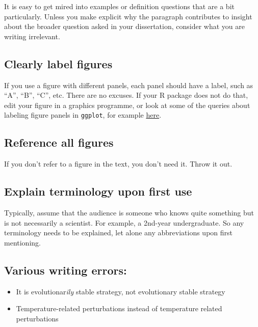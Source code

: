 \documentclass[
]{book}
\providecommand{\tightlist}{%
  \setlength{\itemsep}{0pt}\setlength{\parskip}{0pt}}
\begin{document}
It is easy to get mired into examples or definition questions that are a bit particularly. Unless you
make explicit why the paragraph contributes to insight about the broader question
asked in your dissertation, consider what you are writing irrelevant.

\hypertarget{clearly-label-figures}{%
\subsection{Clearly label figures}\label{clearly-label-figures}}

If you use a figure with different panels, each panel should have a label, such
as ``A'', ``B'', ``C'', etc. There are no excuses. If your R package does not do that,
edit your figure in a graphics programme, or look at some of the queries about
labeling figure panels in \texttt{ggplot}, for example \href{https://stackoverflow.com/questions/17576381/label-individual-panels-in-a-multi-panel-ggplot2}{here}.

\hypertarget{reference-all-figures}{%
\subsection{Reference all figures}\label{reference-all-figures}}

If you don't refer to a figure in the text, you don't need it. Throw it out.

\hypertarget{explain-terminology-upon-first-use}{%
\subsection{Explain terminology upon first use}\label{explain-terminology-upon-first-use}}

Typically, assume that the audience is someone who knows quite something
but is not necessarily a scientist. For example, a 2nd-year undergraduate. So
any terminology needs to be explained, let alone any abbreviations upon first
mentioning.

\hypertarget{various-writing-errors}{%
\subsection{Various writing errors:}\label{various-writing-errors}}

\begin{itemize}
\tightlist
\item
  It is evolutionar\emph{ily} stable strategy, not evolutionary stable strategy
\item
  Temperature-related perturbations instead of temperature related perturbations
\end{itemize}

  
\end{document}
